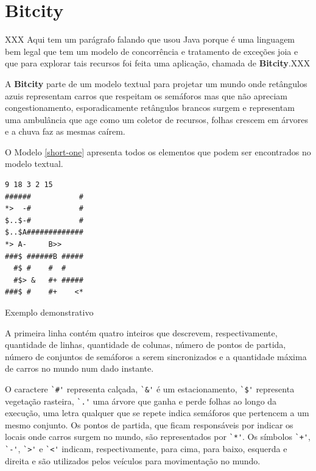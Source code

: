 \chapter{Bitcity}

XXX Aqui tem um parágrafo falando que usou Java porque é uma linguagem
bem legal que tem um modelo de concorrência e tratamento de exceções
joia e que para explorar tais recursos foi feita uma aplicação,
chamada de \textbf{Bitcity}.XXX

A \textbf{Bitcity} parte de um modelo textual para projetar um mundo
onde retângulos azuis representam carros que respeitam os semáforos
mas que não apreciam congestionamento, esporadicamente
retângulos brancos surgem e representam uma ambulância que age como um
coletor de recursos, folhas crescem em árvores e a chuva faz as mesmas
caírem.

O Modelo \ref{short-one} apresenta todos os elementos que podem ser
encontrados no modelo textual.

\begin{model}
\begin{verbatim}
9 18 3 2 15
######           #
*>  -#           #
$..$-#           # 
$..$A#############
*> A-     B>>
###$ ######B #####
  #$ #    #  #    
  #$> &   #+ #####
###$ #    #+    <*
\end{verbatim}
  \caption{Exemplo demonstrativo \label{short-one}}
\end{model}

A primeira linha contém quatro inteiros que descrevem, respectivamente,
quantidade de linhas, quantidade de colunas, número de pontos de
partida, número de conjuntos de semáforos a serem sincronizados e a
quantidade máxima de carros no mundo num dado instante.

O caractere \verb!`#'! representa calçada, \verb!`&'! é um
estacionamento, \verb!`$'! representa
vegetação rasteira, \verb!`.'! uma árvore que ganha e perde folhas ao
longo da execução, uma letra qualquer que se repete indica semáforos
que pertencem a um mesmo conjunto. Os pontos de partida, que ficam
responsáveis por indicar os locais onde carros surgem no mundo, são
representados por \verb!`*'!. Os símbolos \verb!`+'!, \verb!`-'!,
\verb!`>'! e \verb!`<'! indicam, respectivamente, para cima, para
baixo, esquerda e direita e são utilizados pelos veículos para
movimentação no mundo.

